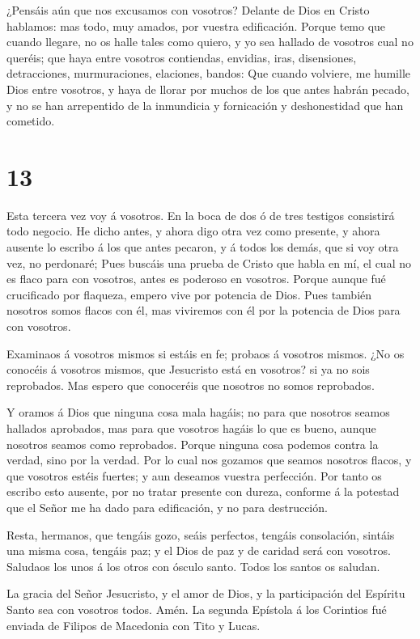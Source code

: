  ¿Pensáis aún que nos excusamos con vosotros? Delante de
Dios en Cristo hablamos: mas todo, muy amados, por vuestra edificación.
 Porque temo que cuando llegare, no os halle tales como
quiero, y yo sea hallado de vosotros cual no queréis; que haya entre
vosotros contiendas, envidias, iras, disensiones, detracciones,
murmuraciones, elaciones, bandos:  Que cuando volviere, me
humille Dios entre vosotros, y haya de llorar por muchos de los que
antes habrán pecado, y no se han arrepentido de la inmundicia y
fornicación y deshonestidad que han cometido.

\hypertarget{section-12}{%
\section{13}\label{section-12}}

 Esta tercera vez voy á vosotros. En la boca de dos ó de
tres testigos consistirá todo negocio.  He dicho antes, y
ahora digo otra vez como presente, y ahora ausente lo escribo á los que
antes pecaron, y á todos los demás, que si voy otra vez, no perdonaré;
 Pues buscáis una prueba de Cristo que habla en mí, el cual
no es flaco para con vosotros, antes es poderoso en vosotros.
 Porque aunque fué crucificado por flaqueza, empero vive por
potencia de Dios. Pues también nosotros somos flacos con él, mas
viviremos con él por la potencia de Dios para con vosotros.

 Examinaos á vosotros mismos si estáis en fe; probaos á
vosotros mismos. ¿No os conocéis á vosotros mismos, que Jesucristo está
en vosotros? si ya no sois reprobados.  Mas espero que
conoceréis que nosotros no somos reprobados.

 Y oramos á Dios que ninguna cosa mala hagáis; no para que
nosotros seamos hallados aprobados, mas para que vosotros hagáis lo que
es bueno, aunque nosotros seamos como reprobados.  Porque
ninguna cosa podemos contra la verdad, sino por la verdad. 
Por lo cual nos gozamos que seamos nosotros flacos, y que vosotros
estéis fuertes; y aun deseamos vuestra perfección.  Por
tanto os escribo esto ausente, por no tratar presente con dureza,
conforme á la potestad que el Señor me ha dado para edificación, y no
para destrucción.

 Resta, hermanos, que tengáis gozo, seáis perfectos,
tengáis consolación, sintáis una misma cosa, tengáis paz; y el Dios de
paz y de caridad será con vosotros.  Saludaos los unos á
los otros con ósculo santo. Todos los santos os saludan.

 La gracia del Señor Jesucristo, y el amor de Dios, y la
participación del Espíritu Santo sea con vosotros todos. Amén. La
segunda Epístola á los Corintios fué enviada de Filipos de Macedonia con
Tito y Lucas.

